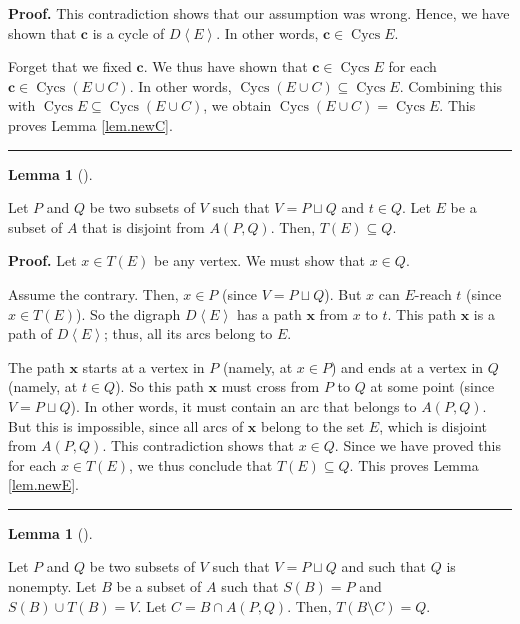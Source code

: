 \documentclass[numbers=enddot,12pt,final,onecolumn,notitlepage]{scrartcl}%
\theoremstyle{definition}
\newtheorem{lem}[theo]{Lemma}
\newenvironment{lemma}[1][]
{\begin{lem}[#1]\begin{leftbar}}
{\end{leftbar}\end{lem}}
\newenvironment{proof}[1][Proof]{\noindent\textbf{#1.} }{\ \rule{0.5em}{0.5em}}
\theoremstyle{plainsl}
\begin{document}
\begin{proof}
This contradiction shows that our assumption was wrong. Hence, we have shown
that $\mathbf{c}$ is a cycle of $D\left\langle E\right\rangle $. In other
words, $\mathbf{c}\in\operatorname*{Cycs}E$.

Forget that we fixed $\mathbf{c}$. We thus have shown that $\mathbf{c}%
\in\operatorname*{Cycs}E$ for each $\mathbf{c}\in\operatorname*{Cycs}\left(
E\cup C\right)  $. In other words, $\operatorname*{Cycs}\left(  E\cup
C\right)  \subseteq\operatorname*{Cycs}E$. Combining this with
$\operatorname*{Cycs}E\subseteq\operatorname*{Cycs}\left(  E\cup C\right)  $,
we obtain $\operatorname*{Cycs}\left(  E\cup C\right)  =\operatorname*{Cycs}%
E$. This proves Lemma \ref{lem.newC}.
\end{proof}

\begin{lemma}
\label{lem.newE}Let $P$ and $Q$ be two subsets of $V$ such that $V=P\sqcup Q$
and $t\in Q$. Let $E$ be a subset of $A$ that is disjoint from $A\left(
P,Q\right)  $. Then, $T\left(  E\right)  \subseteq Q$.
\end{lemma}

\begin{proof}
Let $x\in T\left(  E\right)  $ be any vertex. We must show that $x\in Q$.

Assume the contrary. Then, $x\in P$ (since $V=P\sqcup Q$). But $x$ can
$E$-reach $t$ (since $x\in T\left(  E\right)  $). So the digraph
$D\left\langle E\right\rangle $ has a path $\mathbf{x}$ from $x$ to $t$. This
path $\mathbf{x}$ is a path of $D\left\langle E\right\rangle $; thus, all its
arcs belong to $E$.

The path $\mathbf{x}$ starts at a vertex in $P$ (namely, at $x\in P$) and ends
at a vertex in $Q$ (namely, at $t\in Q$). So this path $\mathbf{x}$ must cross
from $P$ to $Q$ at some point (since $V=P\sqcup Q$). In other words, it must
contain an arc that belongs to $A\left(  P,Q\right)  $. But this is
impossible, since all arcs of $\mathbf{x}$ belong to the set $E$, which is
disjoint from $A\left(  P,Q\right)  $. This contradiction shows that $x\in Q$.
Since we have proved this for each $x\in T\left(  E\right)  $, we thus
conclude that $T\left(  E\right)  \subseteq Q$. This proves Lemma
\ref{lem.newE}.
\end{proof}

\begin{lemma}
\label{lem.newD}Let $P$ and $Q$ be two subsets of $V$ such that $V=P\sqcup Q$
and such that $Q$ is nonempty. Let $B$ be a subset of $A$ such that $S\left(
B\right)  =P$ and $S\left(  B\right)  \cup T\left(  B\right)  =V$. Let
$C=B\cap A\left(  P,Q\right)  $. Then, $T\left(  B\setminus C\right)  =Q$.
\end{lemma}
\end{document}
